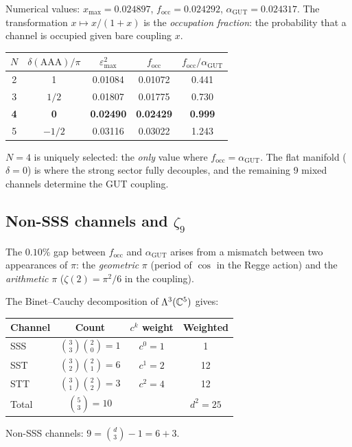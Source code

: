 Numerical values: $x_{\max} = 0.024897$, $f_{\mathrm{occ}} = 0.024292$, $\alpha_\text{GUT} = 0.024317$.  The transformation $x \mapsto x/(1+x)$ is the \emph{occupation fraction}: the probability that a channel is occupied given bare coupling $x$.

\begin{center}
\begin{tabular}{ccccc}
\hline
$N$ & $\delta(\mathrm{AAA})/\pi$ & $\varepsilon_{\max}^2$ & $f_{\mathrm{occ}}$ & $f_{\mathrm{occ}}/\alpha_\text{GUT}$ \\
\hline
2 & 1 & 0.01084 & 0.01072 & 0.441 \\
3 & $1/2$ & 0.01807 & 0.01775 & 0.730 \\
\textbf{4} & \textbf{0} & \textbf{0.02490} & \textbf{0.02429} & \textbf{0.999} \\
5 & $-1/2$ & 0.03116 & 0.03022 & 1.243 \\
\hline
\end{tabular}
\end{center}

$N=4$ is uniquely selected: the \emph{only} value where $f_\mathrm{occ} = \alpha_\text{GUT}$.  The flat manifold ($\delta = 0$) is where the strong sector fully decouples, and the remaining 9 mixed channels determine the GUT coupling.

\subsection{Non-SSS channels and $\zeta_9$}
\label{sec:zeta9}

The $0.10\%$ gap between $f_\mathrm{occ}$ and $\alpha_\text{GUT}$ arises from a mismatch between two appearances of $\pi$: the \emph{geometric} $\pi$ (period of $\cos$ in the Regge action) and the \emph{arithmetic} $\pi$ ($\zeta(2) = \pi^2/6$ in the coupling).

\begin{theorem}
\label{thm:channel_count}
The Binet--Cauchy decomposition of $\Lambda^3(\mathbb{C}^5)$ gives:
\begin{center}
\begin{tabular}{lccc}
\hline
Channel & Count & $c^k$ weight & Weighted \\
\hline
SSS & $\binom{3}{3}\binom{2}{0} = 1$ & $c^0 = 1$ & 1 \\
SST & $\binom{3}{2}\binom{2}{1} = 6$ & $c^1 = 2$ & 12 \\
STT & $\binom{3}{1}\binom{2}{2} = 3$ & $c^2 = 4$ & 12 \\
\hline
Total & $\binom{5}{3} = 10$ & & $d^2 = 25$ \\
\hline
\end{tabular}
\end{center}
Non-SSS channels: $9 = \binom{d}{3} - 1 = 6 + 3$.
\end{theorem}

